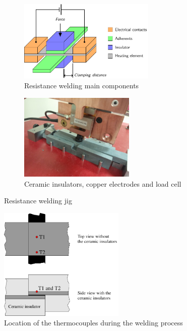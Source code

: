 \documentclass[11pt,review,times]{elsarticle}
\begin{document}
\begin{figure}[htb]
	\centering
	\captionsetup{width=125mm}
	\begin{subfigure}{65mm}
		\centering
		\captionsetup{width=65mm}
		\includegraphics[width=65mm]{beamer_IC3_DBrassard-figure1.pdf}
		\caption{Resistance welding main components \cite{Brassard2018_welding_schematic}}
		\label{fig:welding_jig_schematic}
	\end{subfigure}
	\begin{subfigure}{55mm}
		\centering
		\captionsetup{width=55mm}
		\includegraphics[width=55mm]{20161026_152818_resize.jpg}
		\caption{Ceramic insulators, copper electrodes and load cell}
		\label{fig:welding_jig_electrodes}
	\end{subfigure}%
	\caption{Resistance welding jig}
	\label{fig:welding_jig}
\end{figure}

\begin{figure}
		\center
		\captionsetup{width=60mm}
		\includegraphics[width=60mm]{thermocouple_welding}
		\caption{Location of the thermocouples during the welding process}
		\label{fig:location_thermocouple}
\end{figure} 
\end{document}
